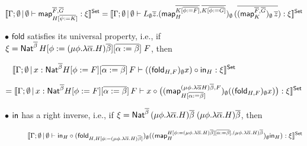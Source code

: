 \documentclass{lmcs}
\theoremstyle{plain}\newtheorem{satz}[thm]{Satz}
\newcommand{\fold}{\mathsf{fold}}
\newcommand{\map}{\mathsf{map}}
\begin{document}
\vspace*{-0.08in}

\[\setsem{\Gamma; \emptyset \,|\, \emptyset \vdash
\map_{H[\ol{\psi := K}]}^{\ol{F}, \ol{G}} : \xi} = \setsem{\Gamma;
  \emptyset \,|\, \emptyset \vdash L_\emptyset \ol
  z. (\map_H^{\ol{K[\ol{\phi := F}]}, \ol{K[\ol{\phi :=
          G}]}})_\emptyset \,(\ol{(\map_K^{\ol{F}, \ol{G}})_\emptyset
    \, \ol z}) : \xi}\]

\vspace*{0.1in}

\noindent
$\bullet$\; $\fold$ satisfies its universal property, i.e., if $\xi =
\mathsf{Nat}^{\overline{\beta}}\, H[\phi :=
  (\mu \phi. \lambda
  \overline{\alpha}. H)\overline{\beta}][\overline{\alpha := \beta}]\;
F$, then

\vspace*{-0.05in}

\[\hspace*{-1in}\setsem{\Gamma; \emptyset \,|\, x:
  \Nat^{\overline{\beta}} H[\phi :=
    F][\overline{\alpha := \beta}]\, F \vdash ((\fold_{H,
    F})_{\emptyset} x) \circ \tin_{H} : \xi}\]

\vspace*{-0.15in}

\[= \setsem{ \Gamma; \emptyset \,|\, x: \Nat^{\overline{\beta}} H[\phi
    := F][\overline{\alpha := \beta}]\, F 
  \vdash x \circ \big( (\map_{H [\ol{\alpha := \beta}]}^{(\mu
    \phi. \lambda \overline{\alpha} H) \overline{\beta},
    F})_\emptyset ((\fold_{H, F})_{\emptyset} x) \big) : \xi}\]

\vspace*{0.1in}

\noindent
$\bullet$\; $\mathsf{in}$ has a right inverse, i.e., if $\xi =
\mathsf{Nat}^{\overline{\beta}}\, (\mu \phi. \lambda
\overline{\alpha}. H)\overline{\beta}\; (\mu \phi. \lambda
\overline{\alpha}. H)\overline{\beta}$, then

\vspace*{-0.05in}

\[\hspace*{0.43in}\setsem{\Gamma; \emptyset \,|\, \emptyset
  \vdash \tin_H \circ (\fold_{H, H[\phi := (\mu \phi. \lambda
      \overline{\alpha}. H)\overline{\beta}]})_{\emptyset}
  ((\map_{H}^{H[\phi := (\mu \phi. \lambda
      \overline{\alpha}. H)\overline{\beta}][\overline{\alpha :=
        \beta}], (\mu \phi. \lambda
    \overline{\alpha}. H)\overline{\beta}})_\emptyset \tin_H) :
  \xi}\]

\vspace*{-0.15in}
\end{document}
